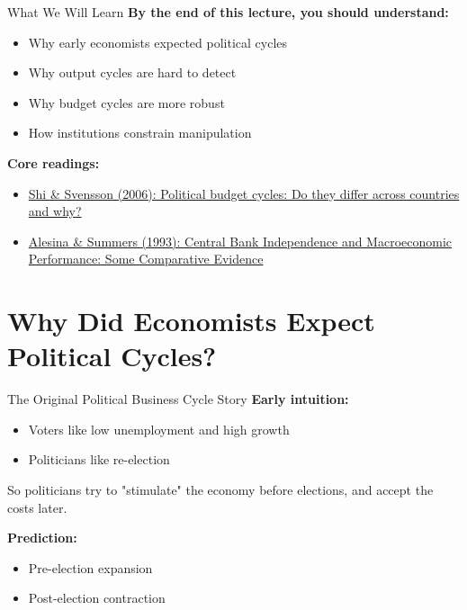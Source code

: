 \documentclass[10pt]{beamer}
\begin{document}
\begin{frame}{What We Will Learn}
\textbf{By the end of this lecture, you should understand:}

\begin{itemize}
\item Why early economists expected political cycles
\item Why output cycles are hard to detect
\item Why \alert{budget cycles} are more robust
\item How \alert{institutions} constrain manipulation
\end{itemize}

\vspace{0.5cm}
\textbf{Core readings:}
\begin{itemize}
\item \href{https://www.sciencedirect.com/science/article/pii/S004727270500143X}{Shi \& Svensson (2006): Political budget cycles: Do they differ across countries and why?}
\item \href{https://www.jstor.org/stable/2077833?seq=1}{Alesina \& Summers (1993): Central Bank Independence and Macroeconomic Performance: Some Comparative Evidence}
\end{itemize}
\end{frame}

\section{Why Did Economists Expect Political Cycles?}

\begin{frame}{The Original Political Business Cycle Story}
\textbf{Early intuition:}

\begin{itemize}
\item Voters like low unemployment and high growth
\item Politicians like re-election
\end{itemize}

\vspace{0.4cm}
\alert{So politicians try to "stimulate" the economy before elections,}
and accept the costs later.

\vspace{0.4cm}
\textbf{Prediction:}
\begin{itemize}
\item Pre-election expansion
\item Post-election contraction
\end{itemize}
\end{frame}
\end{document}
